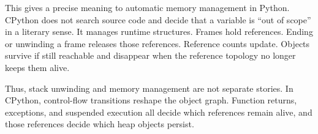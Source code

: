 This gives a precise meaning to automatic memory management in Python. CPython does not search source code and decide that a variable is ``out of scope'' in a literary sense. It manages runtime structures. Frames hold references. Ending or unwinding a frame releases those references. Reference counts update. Objects survive if still reachable and disappear when the reference topology no longer keeps them alive.

Thus, stack unwinding and memory management are not separate stories. In CPython, control-flow transitions reshape the object graph. Function returns, exceptions, and suspended execution all decide which references remain alive, and those references decide which heap objects persist.